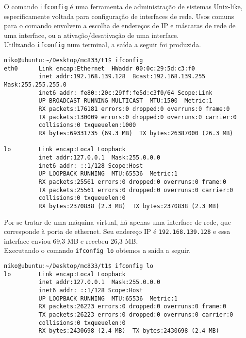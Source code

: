 \documentclass[a4paper,10pt]{article}
\begin{document}
O comando {\tt ifconfig} é uma ferramenta de administração de sistemas Unix-like, especificamente voltada para configuração de interfaces de rede. Usos comuns para o comando envolvem a escolha de endereços de IP e máscaras de rede de uma interface, ou a ativação/desativação de uma interface.\\

Utilizando {\tt ifconfig} num terminal, a saída a seguir foi produzida.

\begin{lstlisting}
niko@ubuntu:~/Desktop/mc833/t1$ ifconfig
eth0      Link encap:Ethernet  HWaddr 00:0c:29:5d:c3:f0  
          inet addr:192.168.139.128  Bcast:192.168.139.255  Mask:255.255.255.0
          inet6 addr: fe80::20c:29ff:fe5d:c3f0/64 Scope:Link
          UP BROADCAST RUNNING MULTICAST  MTU:1500  Metric:1
          RX packets:176181 errors:0 dropped:0 overruns:0 frame:0
          TX packets:130009 errors:0 dropped:0 overruns:0 carrier:0
          collisions:0 txqueuelen:1000 
          RX bytes:69331735 (69.3 MB)  TX bytes:26387000 (26.3 MB)

lo        Link encap:Local Loopback  
          inet addr:127.0.0.1  Mask:255.0.0.0
          inet6 addr: ::1/128 Scope:Host
          UP LOOPBACK RUNNING  MTU:65536  Metric:1
          RX packets:25561 errors:0 dropped:0 overruns:0 frame:0
          TX packets:25561 errors:0 dropped:0 overruns:0 carrier:0
          collisions:0 txqueuelen:0 
          RX bytes:2370838 (2.3 MB)  TX bytes:2370838 (2.3 MB)
\end{lstlisting}

Por se tratar de uma máquina virtual, há apenas uma interface de rede, que corresponde à porta de ethernet. Seu endereço IP é {\tt 192.168.139.128} e essa interface enviou 69,3 MB e recebeu 26,3 MB.\\

Executando o comando {\tt ifconfig lo} obtemos a saída a seguir.

\begin{lstlisting}
niko@ubuntu:~/Desktop/mc833/t1$ ifconfig lo
lo        Link encap:Local Loopback  
          inet addr:127.0.0.1  Mask:255.0.0.0
          inet6 addr: ::1/128 Scope:Host
          UP LOOPBACK RUNNING  MTU:65536  Metric:1
          RX packets:26223 errors:0 dropped:0 overruns:0 frame:0
          TX packets:26223 errors:0 dropped:0 overruns:0 carrier:0
          collisions:0 txqueuelen:0 
          RX bytes:2430698 (2.4 MB)  TX bytes:2430698 (2.4 MB)
\end{lstlisting}
\end{document}
